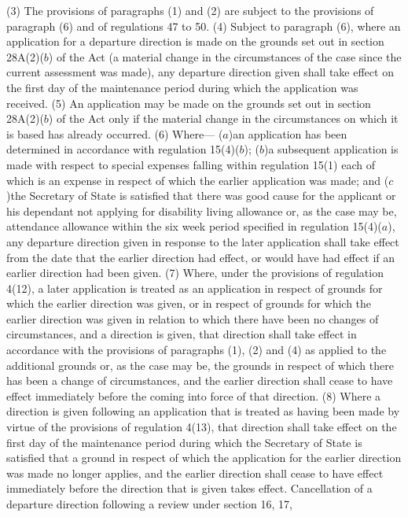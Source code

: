\documentclass[a4paper]{article}
\begin{document}
(3) The provisions of paragraphs (1) and (2) are subject to the provisions of
paragraph (6) and of regulations 47 to 50.
(4) Subject to paragraph (6), where an application for a departure direction is
made on the grounds set out in section 28A(2)($b$) of the Act (a material change
in the circumstances of the case since the current assessment was made), any
departure direction given shall take effect on the first day of the maintenance
period during which the application was received.
(5) An application may be made on the grounds set out in section 28A(2)($b$) of
the Act only if the material change in the circumstances on which it is based
has already occurred.
(6) Where—
($a$)an application has been determined in accordance with regulation 15(4)($b$);
($b$)a subsequent application is made with respect to special expenses falling
within regulation 15(1) each of which is an expense in respect of which the
earlier application was made; and
($c$)the Secretary of State is satisfied that there was good cause for the
applicant or his dependant not applying for disability living allowance or, as
the case may be, attendance allowance within the six week period specified in
regulation 15(4)($a$),
any departure direction given in response to the later application shall take
effect from the date that the earlier direction had effect, or would have had
effect if an earlier direction had been given.
(7) Where, under the provisions of regulation 4(12), a later application is
treated as an application in respect of grounds for which the earlier direction
was given, or in respect of grounds for which the earlier direction was given in
relation to which there have been no changes of circumstances, and a direction
is given, that direction shall take effect in accordance with the provisions of
paragraphs (1), (2) and (4) as applied to the additional grounds or, as the case
may be, the grounds in respect of which there has been a change of
circumstances, and the earlier direction shall cease to have effect immediately
before the coming into force of that direction.
(8) Where a direction is given following an application that is treated as
having been made by virtue of the provisions of regulation 4(13), that direction
shall take effect on the first day of the maintenance period during which the
Secretary of State is satisfied that a ground in respect of which the
application for the earlier direction was made no longer applies, and the
earlier direction shall cease to have effect immediately before the direction
that is given takes effect.
Cancellation of a departure direction following a review under section 16, 17,
\end{document}
